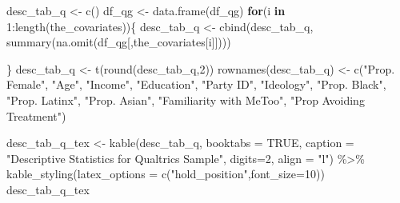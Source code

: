 \documentclass[
]{article}
\newenvironment{Shaded}{\begin{snugshade}}{\end{snugshade}}
\newcommand{\AttributeTok}[1]{\textcolor[rgb]{0.77,0.63,0.00}{#1}}
\newcommand{\ConstantTok}[1]{\textcolor[rgb]{0.00,0.00,0.00}{#1}}
\newcommand{\ControlFlowTok}[1]{\textcolor[rgb]{0.13,0.29,0.53}{\textbf{#1}}}
\newcommand{\DecValTok}[1]{\textcolor[rgb]{0.00,0.00,0.81}{#1}}
\newcommand{\FunctionTok}[1]{\textcolor[rgb]{0.00,0.00,0.00}{#1}}
\newcommand{\NormalTok}[1]{#1}
\newcommand{\OtherTok}[1]{\textcolor[rgb]{0.56,0.35,0.01}{#1}}
\newcommand{\SpecialCharTok}[1]{\textcolor[rgb]{0.00,0.00,0.00}{#1}}
\newcommand{\StringTok}[1]{\textcolor[rgb]{0.31,0.60,0.02}{#1}}
\begin{document}
\begin{Shaded}
\begin{Highlighting}[]
\NormalTok{desc\_tab\_q }\OtherTok{\textless{}{-}} \FunctionTok{c}\NormalTok{()}
\NormalTok{df\_qg }\OtherTok{\textless{}{-}} \FunctionTok{data.frame}\NormalTok{(df\_qg)}
\ControlFlowTok{for}\NormalTok{(i }\ControlFlowTok{in} \DecValTok{1}\SpecialCharTok{:}\FunctionTok{length}\NormalTok{(the\_covariates))\{}
\NormalTok{  desc\_tab\_q }\OtherTok{\textless{}{-}} \FunctionTok{cbind}\NormalTok{(desc\_tab\_q,}
                       \FunctionTok{summary}\NormalTok{(}\FunctionTok{na.omit}\NormalTok{(df\_qg[,the\_covariates[i]])))}
                       
\NormalTok{\}}
\NormalTok{desc\_tab\_q }\OtherTok{\textless{}{-}} \FunctionTok{t}\NormalTok{(}\FunctionTok{round}\NormalTok{(desc\_tab\_q,}\DecValTok{2}\NormalTok{))}
\FunctionTok{rownames}\NormalTok{(desc\_tab\_q) }\OtherTok{\textless{}{-}} \FunctionTok{c}\NormalTok{(}\StringTok{"Prop. Female"}\NormalTok{, }\StringTok{"Age"}\NormalTok{, }\StringTok{"Income"}\NormalTok{, }\StringTok{"Education"}\NormalTok{,}
                           \StringTok{"Party ID"}\NormalTok{, }\StringTok{"Ideology"}\NormalTok{,}
                           \StringTok{"Prop. Black"}\NormalTok{,}
                           \StringTok{"Prop. Latinx"}\NormalTok{,}
                           \StringTok{"Prop. Asian"}\NormalTok{,}
                           \StringTok{"Familiarity with MeToo"}\NormalTok{,}
                           \StringTok{"Prop Avoiding Treatment"}\NormalTok{)}



\NormalTok{desc\_tab\_q\_tex }\OtherTok{\textless{}{-}} \FunctionTok{kable}\NormalTok{(desc\_tab\_q,}
      \AttributeTok{booktabs =} \ConstantTok{TRUE}\NormalTok{, }
               \AttributeTok{caption =} \StringTok{"Descriptive Statistics for Qualtrics Sample"}\NormalTok{, }
               \AttributeTok{digits=}\DecValTok{2}\NormalTok{,}
  \AttributeTok{align =} \StringTok{"l"}\NormalTok{) }\SpecialCharTok{\%\textgreater{}\%} 
  \FunctionTok{kable\_styling}\NormalTok{(}\AttributeTok{latex\_options =} \FunctionTok{c}\NormalTok{(}\StringTok{"hold\_position"}\NormalTok{,}\AttributeTok{font\_size=}\DecValTok{10}\NormalTok{))}
\NormalTok{desc\_tab\_q\_tex}
\end{Highlighting}
\end{Shaded}
\end{document}
